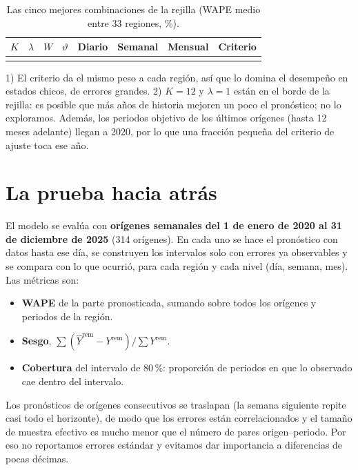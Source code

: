 \begin{table}[H]
\centering
\caption{Las cinco mejores combinaciones de la rejilla (WAPE medio entre 33 regiones, \%).}\label{tab:rejilla}
\small
\begin{tabular}{@{}rrrrrrrr@{}}
\toprule
$K$ & $\lambda$ & $W$ & $\vartheta$ & Diario & Semanal & Mensual & Criterio \\
\midrule

\\
\bottomrule
\end{tabular}
\end{table}

\begin{cuidado}
1) El criterio da el mismo peso a cada región, así que lo domina el desempeño en estados chicos, de errores grandes. 2) $K=12$ y $\lambda=1$ están en el borde de la rejilla: es posible que más años de historia mejoren un poco el pronóstico; no lo exploramos. Además, los periodos objetivo de los últimos orígenes (hasta 12 meses adelante) llegan a 2020, por lo que una fracción pequeña del criterio de ajuste toca ese año.
\end{cuidado}

\section{La prueba hacia atrás}

El modelo se evalúa con \textbf{orígenes semanales del 1 de enero de 2020 al 31 de diciembre de 2025} (314 orígenes). En cada uno se hace el pronóstico con datos hasta ese día, se construyen los intervalos solo con errores ya observables y se compara con lo que ocurrió, para cada región y cada nivel (día, semana, mes). Las métricas son:

\begin{itemize}
  \item \textbf{WAPE} de la parte pronosticada, sumando sobre todos los orígenes y periodos de la región.
  \item \textbf{Sesgo}, $\sum(\widehat Y^{\mathrm{rem}}-Y^{\mathrm{rem}})/\sum Y^{\mathrm{rem}}$.
  \item \textbf{Cobertura} del intervalo de $80\,\%$: proporción de periodos en que lo observado cae dentro del intervalo.
\end{itemize}

\begin{cuidado}
Los pronósticos de orígenes consecutivos se traslapan (la semana siguiente repite casi todo el horizonte), de modo que los errores están correlacionados y el tamaño de muestra efectivo es mucho menor que el número de pares origen--periodo. Por eso no reportamos errores estándar y evitamos dar importancia a diferencias de pocas décimas.
\end{cuidado}

